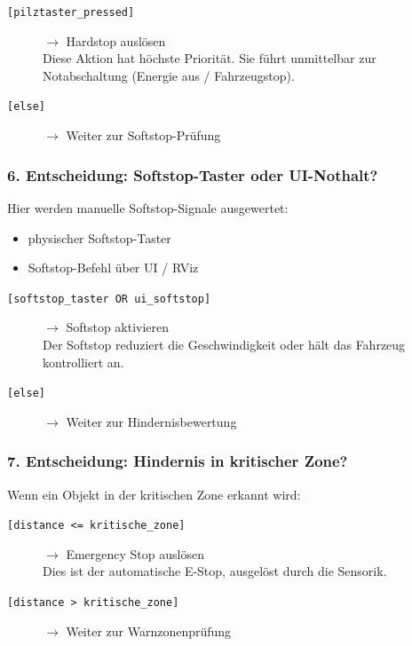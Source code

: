 \begin{description}
    \item[\texttt{[pilztaster\_pressed]}] $\rightarrow$ \ac{Hardstop} auslösen\\
    \quad Diese Aktion hat höchste Priorität. Sie führt unmittelbar zur Notabschaltung (Energie aus / Fahrzeugstop).
    \item[\texttt{[else]}] $\rightarrow$ Weiter zur \ac{Softstop}-Prüfung
\end{description}

\subsubsection*{6. Entscheidung: \ac{Softstop}-Taster oder UI-Nothalt?}

\quad Hier werden manuelle \ac{Softstop}-Signale ausgewertet:
\begin{itemize}
    \item physischer \ac{Softstop}-Taster
    \item \ac{Softstop}-Befehl über UI / RViz
\end{itemize}

\begin{description}
    \item[\texttt{[softstop\_taster OR ui\_softstop]}] $\rightarrow$ \ac{Softstop} aktivieren\\
    \quad Der \ac{Softstop} reduziert die Geschwindigkeit oder hält das Fahrzeug kontrolliert an.
    \item[\texttt{[else]}] $\rightarrow$ Weiter zur Hindernisbewertung
\end{description}

\subsubsection*{7. Entscheidung: Hindernis in kritischer Zone?}

\quad Wenn ein Objekt in der kritischen Zone erkannt wird:

\begin{description}
    \item[\texttt{[distance <= kritische\_zone]}] $\rightarrow$ Emergency Stop auslösen\\
    \quad Dies ist der automatische E-Stop, ausgelöst durch die Sensorik.
    \item[\texttt{[distance > kritische\_zone]}] $\rightarrow$ Weiter zur Warnzonenprüfung
\end{description}

